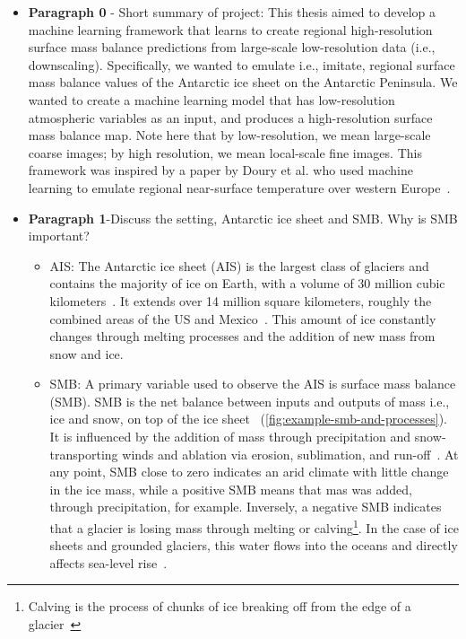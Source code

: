 \documentclass[a4paper,11pt,oneside]{report}
\begin{document}
 
\begin{itemize}
    
    \item \textbf{Paragraph 0} - Short summary of project: This thesis aimed to develop a machine learning framework that learns to create regional high-resolution surface mass balance predictions from large-scale low-resolution data (i.e., downscaling). Specifically, we wanted to emulate i.e., imitate, regional surface mass balance values of the Antarctic ice sheet on the Antarctic Peninsula. We wanted to create a machine learning model that has low-resolution atmospheric variables as an input, and produces a high-resolution surface mass balance map. Note here that by low-resolution, we mean large-scale coarse images; by high resolution, we mean local-scale fine images. This framework was inspired by a paper by Doury et al. who used machine learning to emulate regional near-surface temperature over western Europe~\cite{Doury}.
    \item \textbf{Paragraph 1}-Discuss the setting, Antarctic ice sheet and SMB. Why is SMB important?
    \begin{itemize}
        \item AIS: The Antarctic ice sheet (AIS) is the largest class of glaciers and contains the majority of ice on Earth, with a volume of 30 million cubic kilometers~\cite{Icesheetsquick}. It extends over 14 million square kilometers, roughly the combined areas of the US and Mexico~\cite{AntarcticIceSheet}. This amount of ice constantly changes through melting processes and the addition of new mass from snow and ice.
        \item SMB: A primary variable used to observe the AIS is surface mass balance (SMB). SMB is the net balance between inputs and outputs of mass i.e., ice and snow, on top of the ice sheet~\cite{Lenaerts2019} (\autoref{fig:example-smb-and-processes}). It is influenced by the addition of mass through precipitation and snow‐transporting winds and ablation via erosion, sublimation, and run-off~\cite{Kittel}. At any point, SMB close to zero indicates an arid climate with little change in the ice mass, while a positive SMB means that mas was added, through precipitation, for example. Inversely, a negative SMB indicates that a glacier is losing mass through melting or calving\footnote{Calving is the process of chunks of ice breaking off from the edge of a glacier~\cite{Marshak}}. In the case of ice sheets and grounded glaciers, this water flows into the oceans and directly affects sea-level rise~\cite{icesheet}. 
        

\end{itemize}
\end{itemize}
\end{document}
